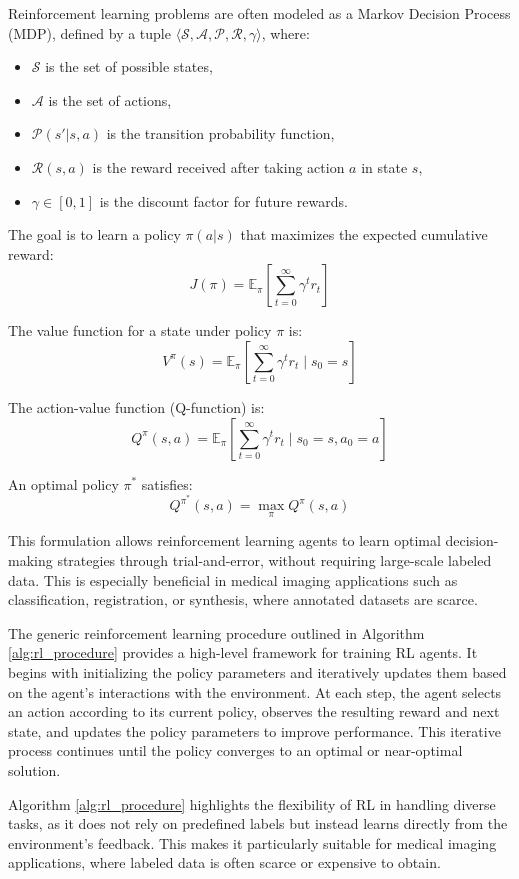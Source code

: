 \documentclass{article}
\begin{document}
Reinforcement learning problems are often modeled as a Markov Decision Process (MDP), defined by a tuple $\langle \mathcal{S}, \mathcal{A}, \mathcal{P}, \mathcal{R}, \gamma \rangle$, where:
\begin{itemize}
    \item $\mathcal{S}$ is the set of possible states,
    \item $\mathcal{A}$ is the set of actions,
    \item $\mathcal{P}(s' | s, a)$ is the transition probability function,
    \item $\mathcal{R}(s, a)$ is the reward received after taking action $a$ in state $s$,
    \item $\gamma \in [0, 1]$ is the discount factor for future rewards.
\end{itemize}

The goal is to learn a policy $\pi(a|s)$ that maximizes the expected cumulative reward:
\[
J(\pi) = \mathbb{E}_{\pi} \left[ \sum_{t=0}^{\infty} \gamma^t r_t \right]
\]

The value function for a state under policy $\pi$ is:
\[
V^{\pi}(s) = \mathbb{E}_{\pi} \left[ \sum_{t=0}^{\infty} \gamma^t r_t \mid s_0 = s \right]
\]

The action-value function (Q-function) is:
\[
Q^{\pi}(s, a) = \mathbb{E}_{\pi} \left[ \sum_{t=0}^{\infty} \gamma^t r_t \mid s_0 = s, a_0 = a \right]
\]

An optimal policy $\pi^*$ satisfies:
\[
Q^{\pi^*}(s, a) = \max_{\pi} Q^{\pi}(s, a)
\]

This formulation allows reinforcement learning agents to learn optimal decision-making strategies through trial-and-error, without requiring large-scale labeled data. This is especially beneficial in medical imaging applications such as classification, registration, or synthesis, where annotated datasets are scarce.

The generic reinforcement learning procedure outlined in Algorithm \ref{alg:rl_procedure} provides a high-level framework for training RL agents. It begins with initializing the policy parameters and iteratively updates them based on the agent's interactions with the environment. At each step, the agent selects an action according to its current policy, observes the resulting reward and next state, and updates the policy parameters to improve performance. This iterative process continues until the policy converges to an optimal or near-optimal solution.

Algorithm \ref{alg:rl_procedure} highlights the flexibility of RL in handling diverse tasks, as it does not rely on predefined labels but instead learns directly from the environment's feedback. This makes it particularly suitable for medical imaging applications, where labeled data is often scarce or expensive to obtain.
\end{document}
